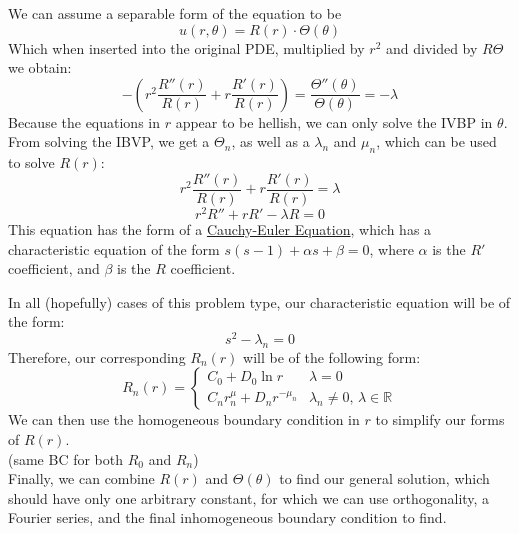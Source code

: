 \documentclass{article}
\begin{document}
\begin{enumerate}
    We can assume a separable form of the equation to be
    \[
        u(r, \theta) = R(r) \cdot \Theta(\theta)
    \]
    Which when inserted into the original PDE, multiplied by $r^2$ and divided by $R\Theta$ we obtain:
    \[
        -\left(r^2\frac{R''(r)}{R(r)} + r \frac{R'(r)}{R(r)}\right) = \frac{\Theta''(\theta)}{\Theta(\theta)} = -\lambda
    \]
    Because the equations in $r$ appear to be hellish, we can only solve the IVBP in $\theta$.
    \medskip\\
    From solving the IBVP, we get a $\Theta_n$, as well as a $\lambda_n$ and $\mu_n$, which can be used to solve $R(r)$:
    \[
        r^2\frac{R''(r)}{R(r)} + r \frac{R'(r)}{R(r)} = \lambda
    \]
    \[
        r^2R'' + rR' - \lambda R = 0
    \]
    This equation has the form of a \underline{Cauchy-Euler Equation}, which has a characteristic equation of the form $s(s-1) + \alpha s + \beta = 0$, where $\alpha$ is the $R'$ coefficient, and $\beta$ is the $R$ coefficient.
    
    In all (hopefully) cases of this problem type, our characteristic equation will be of the form:
    \[
        s^2 - \lambda_n = 0
    \]
    Therefore, our corresponding $R_n(r)$ will be of the following form:
    \[
        R_n(r) = 
        \begin{cases}
            C_0 + D_0\ln r & \lambda = 0\\
            C_n r^\mu_n + D_n r^{-\mu_n} & \lambda_n \neq 0, \, \lambda \in \mathbb{R}
        \end{cases}
    \]
    We can then use the homogeneous boundary condition in $r$ to simplify our forms of $R(r)$. \\(same BC for both $R_0$ and $R_n$)
    \medskip\\
    Finally, we can combine $R(r)$ and $\Theta(\theta)$ to find our general solution, which should have only one arbitrary constant, for which we can use orthogonality, a Fourier series, and the final inhomogeneous boundary condition to find.
    

\end{enumerate}
\end{document}
